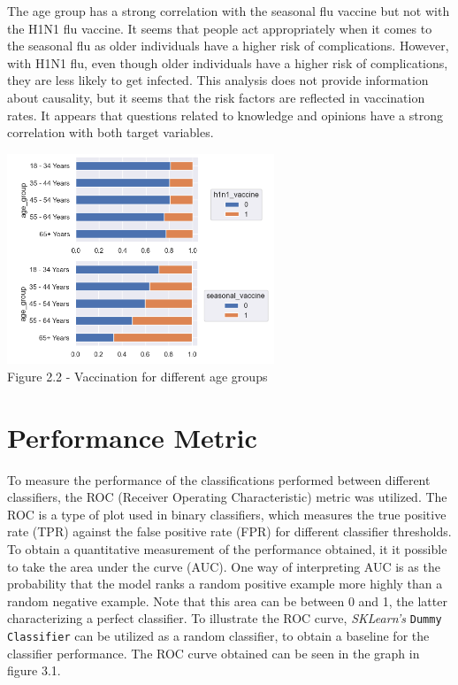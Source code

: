 \documentclass{IEEEtran}
\begin{document}
The age group has a strong correlation with the seasonal flu vaccine but not with the H1N1 flu vaccine. It seems that people act appropriately when it comes to the seasonal flu as older individuals have a higher risk of complications. However, with H1N1 flu, even though older individuals have a higher risk of complications, they are less likely to get infected. This analysis does not provide information about causality, but it seems that the risk factors are reflected in vaccination rates.
It appears that questions related to knowledge and opinions have a strong correlation with both target variables.

\begin{center}
    \includegraphics[width = 8cm]{figures/Age.png}\\
    Figure 2.2 - Vaccination for different age groups
\end{center}

\section{Performance Metric}
To measure the performance of the classifications performed between different classifiers, the ROC (Receiver Operating Characteristic) metric was utilized. The ROC is a type of plot used in binary classifiers, which measures the true positive rate (TPR) against the false positive rate (FPR) for different classifier thresholds. To obtain a quantitative measurement of the performance obtained, it it possible to take the area under the curve (AUC). One way of interpreting AUC is as the probability that the model ranks a random positive example more highly than a random negative example. Note that this area can be between 0 and 1, the latter characterizing a perfect classifier.
To illustrate the ROC curve, \textit{SKLearn's} \texttt{Dummy Classifier} can be utilized as a random classifier, to obtain a baseline for the classifier performance. The ROC curve obtained can be seen in the graph in figure 3.1.
\end{document}
